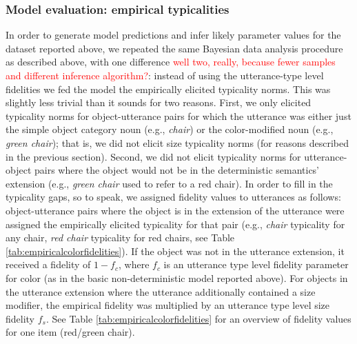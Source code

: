\documentclass[11pt]{article}
\newcommand{\red}[1]{\textcolor{Red}{#1}}
\newcommand{\tableref}[1]{Table \ref{#1}}
\begin{document}
\subsubsection{Model evaluation: empirical typicalities}

In order to generate model predictions and infer likely parameter values for the dataset reported above,  we repeated the same Bayesian data analysis procedure as described above, with one difference \red{well two, really, because fewer samples and different inference algorithm?}: instead of using the utterance-type level fidelities we fed the model the empirically elicited typicality norms. This was slightly less trivial than it sounds for two reasons. First, we only elicited typicality norms for object-utterance pairs for which the utterance was either just the simple object category noun (e.g., \emph{chair}) or the color-modified noun (e.g., \emph{green chair}); that is, we did not elicit size typicality norms (for reasons described in the previous section). Second, we did not elicit typicality norms for utterance-object pairs where the object would not be in the deterministic semantics' extension (e.g., \emph{green chair} used to refer to a red chair). In order to fill in the typicality gaps, so to speak, we assigned fidelity values to utterances as follows: object-utterance pairs where the object is in the extension of the utterance were assigned the empirically elicited typicality for that pair (e.g., \emph{chair} typicality for any chair, \emph{red chair} typicality for red chairs, see \tableref{tab:empiricalcolorfidelities}). If the object was not in the utterance extension, it received a fidelity of $1 - f_{c}$, where $f_c$ is an utterance type level fidelity parameter for color (as in the basic non-deterministic model reported above). For objects in the utterance extension where the utterance additionally contained a size modifier, the empirical fidelity was multiplied by an utterance type level size fidelity $f_{s}$. See \tableref{tab:empiricalcolorfidelities} for an overview of fidelity values for one item (red/green chair). 
\end{document}
